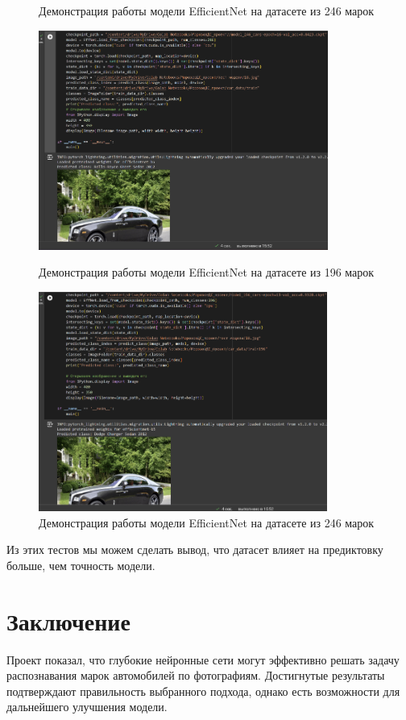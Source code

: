 \documentclass[14pt]{extarticle}
\begin{document}
\begin{figure}[H]
\begin{minipage}{0.49\textwidth}
  \caption{Демонстрация работы модели \foreignlanguage{english}{EfficientNet} на датасете из 246 марок}
  \label{fig:13}
\end{minipage}
\end{figure}\begin{figure}[H]
\centering
\begin{minipage}{0.49\textwidth}
  \centering
  \includegraphics[height=7.2cm]{images/28.png}  
  \caption{Демонстрация работы модели \foreignlanguage{english}{EfficientNet} на датасете из 196 марок}
  \label{fig:12}
\end{minipage}
\hfill
\begin{minipage}{0.49\textwidth}
  \centering
  \includegraphics[height=7.2cm]{images/29.png}  
  \caption{Демонстрация работы модели \foreignlanguage{english}{EfficientNet} на датасете из 246 марок}
  \label{fig:13}
\end{minipage}
\end{figure}

Из этих тестов мы можем сделать вывод, что датасет влияет на предиктовку больше, чем точность модели.


\section[Заключение]{\textbf{Заключение}}
Проект показал, что глубокие нейронные сети могут эффективно решать задачу распознавания марок автомобилей по
фотографиям. Достигнутые результаты подтверждают правильность выбранного подхода, однако есть возможности для
дальнейшего улучшения модели.
\end{document}
